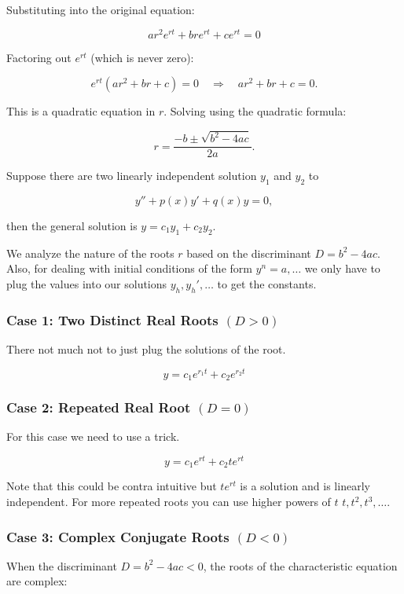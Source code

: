 Substituting into the original equation:

\[
    ar^2 e^{rt} + bre^{rt} + ce^{rt} = 0
\]

Factoring out \( e^{rt} \) (which is never zero):

\[
    e^{rt}(ar^2 + br + c) = 0 \quad \Rightarrow \quad ar^2 + br + c = 0.
\]

This is a quadratic equation in \( r \). Solving using the quadratic formula:

\[
    r = \frac{-b \pm \sqrt{b^2 - 4ac}}{2a}.
\]

Suppose there are two linearly independent solution \(y_1\) and \(y_2\) to

\[
    y'' + p(x)y' + q(x)y = 0,
\]

then the general solution is \(y = c_1 y_1 + c_2 y_2\).

We analyze the nature of the roots \( r \) based on the discriminant \( D = b^2 - 4ac \).
Also, for dealing with initial conditions of the form \(y^n = a, \dots\) we only have to 
plug the values into our solutions \(y_h, y_{h}', \dots \) to get the constants.

\subsubsection{Case 1: Two Distinct Real Roots \texorpdfstring{\( (D > 0) \)}{}}

There not much not to just plug the solutions of the root.

\[
    y = c_1 e^{r_1 t} + c_2 e^{r_2 t}
\]

\subsubsection{Case 2: Repeated Real Root \texorpdfstring{\( (D = 0) \)}{}}

For this case we need to use a trick.

\[
    y = c_1 e^{rt} + c_2 te^{rt}
\]

Note that this could be contra intuitive but \(te^{rt}\) is a solution and is linearly independent.
For more repeated roots you can use higher powers of \(t\) \(t, t^2, t^3, \dots\).

\subsubsection{Case 3: Complex Conjugate Roots \texorpdfstring{\( (D < 0) \)}{}}

When the discriminant \( D = b^2 - 4ac < 0 \), the roots of the characteristic equation are complex:

